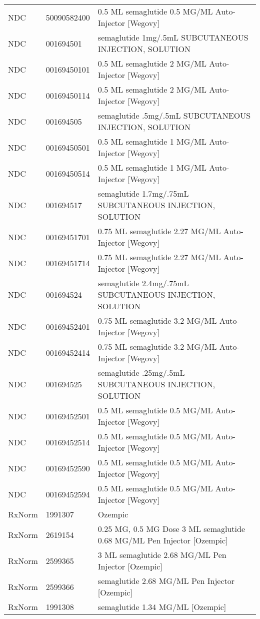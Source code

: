 \begin{longtable}{p{}p{}p{}}
  NDC & 50090582400 & 0.5 ML semaglutide 0.5 MG/ML Auto-Injector [Wegovy] \\ 
  NDC & 001694501 & semaglutide 1mg/.5mL SUBCUTANEOUS INJECTION, SOLUTION \\ 
  NDC & 00169450101 & 0.5 ML semaglutide 2 MG/ML Auto-Injector [Wegovy] \\ 
  NDC & 00169450114 & 0.5 ML semaglutide 2 MG/ML Auto-Injector [Wegovy] \\ 
  NDC & 001694505 & semaglutide .5mg/.5mL SUBCUTANEOUS INJECTION, SOLUTION \\ 
  NDC & 00169450501 & 0.5 ML semaglutide 1 MG/ML Auto-Injector [Wegovy] \\ 
  NDC & 00169450514 & 0.5 ML semaglutide 1 MG/ML Auto-Injector [Wegovy] \\ 
  NDC & 001694517 & semaglutide 1.7mg/.75mL SUBCUTANEOUS INJECTION, SOLUTION \\ 
  NDC & 00169451701 & 0.75 ML semaglutide 2.27 MG/ML Auto-Injector [Wegovy] \\ 
  NDC & 00169451714 & 0.75 ML semaglutide 2.27 MG/ML Auto-Injector [Wegovy] \\ 
  NDC & 001694524 & semaglutide 2.4mg/.75mL SUBCUTANEOUS INJECTION, SOLUTION \\ 
  NDC & 00169452401 & 0.75 ML semaglutide 3.2 MG/ML Auto-Injector [Wegovy] \\ 
  NDC & 00169452414 & 0.75 ML semaglutide 3.2 MG/ML Auto-Injector [Wegovy] \\ 
  NDC & 001694525 & semaglutide .25mg/.5mL SUBCUTANEOUS INJECTION, SOLUTION \\ 
  NDC & 00169452501 & 0.5 ML semaglutide 0.5 MG/ML Auto-Injector [Wegovy] \\ 
  NDC & 00169452514 & 0.5 ML semaglutide 0.5 MG/ML Auto-Injector [Wegovy] \\ 
  NDC & 00169452590 & 0.5 ML semaglutide 0.5 MG/ML Auto-Injector [Wegovy] \\ 
  NDC & 00169452594 & 0.5 ML semaglutide 0.5 MG/ML Auto-Injector [Wegovy] \\ 
  RxNorm & 1991307 & Ozempic \\ 
  RxNorm & 2619154 & 0.25 MG, 0.5 MG Dose 3 ML semaglutide 0.68 MG/ML Pen Injector [Ozempic] \\ 
  RxNorm & 2599365 & 3 ML semaglutide 2.68 MG/ML Pen Injector [Ozempic] \\ 
  RxNorm & 2599366 & semaglutide 2.68 MG/ML Pen Injector [Ozempic] \\ 
  RxNorm & 1991308 & semaglutide 1.34 MG/ML [Ozempic] \\ 

\end{longtable}
